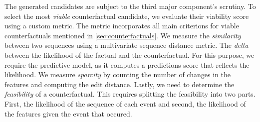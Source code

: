 \documentclass[./../../paper.tex]{subfiles}
\begin{document}
The generated candidates are subject to the third major component's scrutiny. 
To select the most \emph{viable} counterfactual candidate, we evaluate their viability score using a custom metric. 
The metric incorporates all main criterions for viable counterfactuals mentioned in \autoref{sec:counterfactuals}. 
We measure the \emph{similarity} between two sequences using a multivariate sequence distance metric. The \emph{delta} between the likelihood of the factual and the counterfactual. For this purpose, we require the predictive model, as it computes a predictions score that reflects the likelihood. 
We measure \emph{sparcity} by counting the number of changes in the features and computing the edit distance. Lastly, we need to determine the \emph{feasibility} of a counterfactual. This requires splitting the feasibility into two parts. First, the likelihood of the sequence of each event and second, the likelihood of the features given the event that occured.
\end{document}
